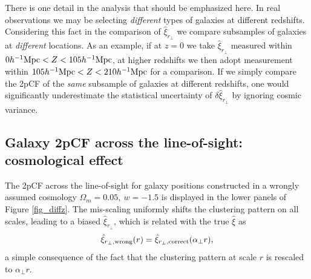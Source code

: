 \documentclass[iop]{emulateapj}
\begin{document}
There is one detail in the analysis that should be emphasized here.
In real observations we may be selecting {\it different} types of galaxies at different redshifts.
Considering this fact in the comparison of $\hat\xi_{r_\perp}$ 
we compare subsamples of galaxies at {\it different} locations.
As an example, if at $z=0$ we take $\hat\xi_{r_\perp}$ measured within $0h^{-1}{\rm Mpc}<Z<105 h^{-1}{\rm Mpc}$,
at higher redshifts we then adopt measurement within $105h^{-1}{\rm Mpc}<Z<210 h^{-1}{\rm Mpc}$ for a comparison.
If we simply compare the 2pCF of the {\it same} subsample of galaxies at different redshifts, 
one would significantly underestimate the statistical uncertainty of $\delta \hat{\xi}_{r_\perp}$ by ignoring cosmic variance.




\subsection{Galaxy 2pCF across the line-of-sight: cosmological effect }

The 2pCF across the line-of-sight for galaxy positions constructed in a wrongly assumed cosmology $\Omega_m=0.05,\ w=-1.5$
is displayed in the lower panels of Figure \ref{fig_diffz}.
The mis-scaling uniformly shifts the clustering pattern on all scales, 
leading to a biased $\hat \xi_{r_\perp}$, which is 
related with the true $\hat \xi$ as
\begin{equation}
 \hat \xi_{r_\perp,\rm wrong}(r) = \hat \xi_{r_\perp, \rm correct}(\alpha_{\perp} r),
\end{equation}
a simple consequence of the fact that the clustering pattern at scale $r$ is rescaled to $\alpha_{\perp} r$.
\end{document}
